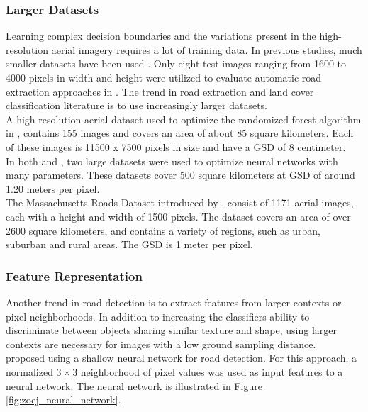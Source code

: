 \subsubsection{Larger Datasets}
Learning complex decision boundaries and the variations present in the high-resolution aerial imagery requires a lot of training data. In previous studies, much smaller datasets have been used \citep{Mokhtarzade_road_ann} \citep{Song_road_extraction_svm}. Only eight test images ranging from 1600 to 4000 pixels in width and height were utilized to evaluate automatic road extraction approaches in \citep{Mayer_road_test}. The trend in road extraction and land cover classification literature is to use increasingly larger datasets.\\

A high-resolution aerial dataset used to optimize the randomized forest algorithm in \citep{Kluckner_semantic_height}, contains  155 images and covers an area of about 85 square kilometers. Each of these images is 11500 x 7500 pixels in size and have a \ac{GSD} of 8 centimeter.\\

In both \citep{Mnih_roads_high_res_aerial_images} and \citep{Mnih_aerial_images_noisy}, two large datasets were used to optimize neural networks with many parameters. These datasets cover 500 square kilometers at \ac{GSD} of around 1.20 meters per pixel.\\

The Massachusetts Roads Dataset introduced by \cite{MnihThesis}, consist of 1171 aerial images, each with a height and width of 1500 pixels. The dataset covers an area of over 2600 square kilometers, and contains a variety of regions, such as urban, suburban and rural areas. The \ac{GSD} is 1 meter per pixel.\\


\subsubsection{Feature Representation}
Another trend in road detection is to extract features from larger contexts or pixel neighborhoods. In addition to increasing the classifiers ability to discriminate between objects sharing similar texture and shape, using larger contexts are necessary for images with a low ground sampling distance.\\

\cite{Mokhtarzade_road_ann} proposed using a shallow neural network for road detection. For this approach, a normalized $3 \times 3$ neighborhood of pixel values was used as input features to a neural network. The neural network is illustrated in Figure \ref{fig:zoej_neural_network}. \\

